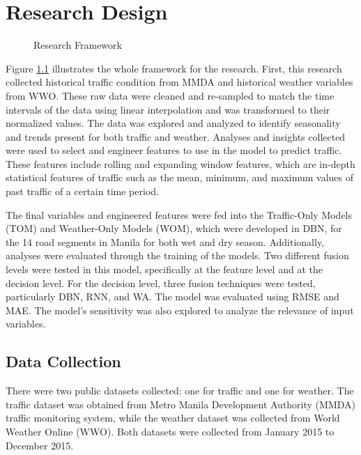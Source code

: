 \chapter{Research Design}
\label{resdes}
\begin{comment}

\end{comment}

\begin{figure}[h]
	\centering
	\captionsetup{justification=centering}
	\caption{Research Framework}
	\label{fig:framework}
\end{figure}




Figure \ref{fig:framework} illustrates the whole framework for the research. First, this research collected historical traffic condition from MMDA and historical weather variables from WWO. These raw data were cleaned and re-sampled to match the time intervals of the data using linear interpolation and was transformed to their normalized values. The data was explored and analyzed to identify seasonality and trends present for both traffic and weather. Analyses and insights collected were used to select and engineer features to use in the model to predict traffic. These features include rolling and expanding window features, which are in-depth statistical features of traffic such as the mean, minimum, and maximum values of past traffic of a certain time period.

The final variables and engineered features were fed into the Traffic-Only Models (TOM) and Weather-Only Models (WOM), which were developed in DBN, for the 14 road segments in Manila for both wet and dry season. Additionally, analyses were evaluated through the training of the models. Two different fusion levels were tested in this model, specifically at the feature level and at the decision level. For the decision level, three fusion techniques were tested, particularly DBN, RNN, and WA. The model was evaluated using RMSE and MAE. The model’s sensitivity was also explored to analyze the relevance of input variables. 

\section{Data Collection}
\label{rd_datacollection}
There were two public datasets collected: one for traffic and one for weather. The traffic dataset was obtained from Metro Manila Development Authority (MMDA) traffic monitoring system, while the weather dataset was collected from World Weather Online (WWO). Both datasets were collected from January 2015 to December 2015.


